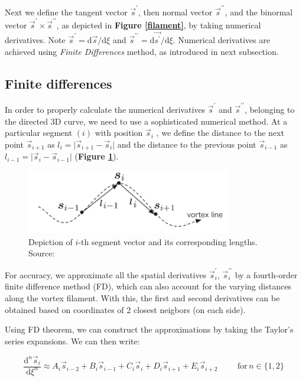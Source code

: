 Next we define the tangent vector $\vec{s}^{\prime}$, then normal vector $\vec{s}^{\prime\prime}$, and the binormal vector $\vec{s}^{\prime} \times \vec{s}^{\prime\prime}$, as depicted in \textbf{Figure \ref{filament}}, by taking numerical derivatives.
Note $\vec{s}^{\prime} = \text{d}\vec{s} / \text{d}\xi$ and $\vec{s}^{\prime\prime} = \text{d}\vec{s^{\prime}} / \text{d}\xi$.
Numerical derivatives are achieved using \textit{Finite Differences} method, as introduced in next subsection.


\subsection*{Finite differences}

In order to properly calculate the numerical derivatives $\vec{s}^{\prime}$ and $\vec{s}^{\prime\prime}$, belonging to the directed 3D curve, we need to use a sophisticated numerical method.
At a particular segment $(i)$ with position $\vec{s}_i$ , we define the distance to the next point $\vec{s}_{i+1}$ as $l_{i} = \vert \vec{s}_{i+1} - \vec{s}_i \vert$ and the distance to the previous point $\vec{s}_{i-1}$ as $l_{i-1} = \vert \vec{s}_i - \vec{s}_{i-1} \vert$ (\textbf{Figure \ref{FD}}).

\begin{figure}[h]
	\centering
	\includegraphics[width=0.8\textwidth]{graphics/simul/finite-diff}
	\caption{Depiction of $i$-th segment vector and its corresponding lengths. Source: \cite{tsubota}}
	\label{FD}
\end{figure}

For accuracy, we approximate all the spatial derivatives $\vec{s}_i^{\prime}$, $\vec{s}_i^{\prime\prime}$ by a
fourth-order finite difference method (FD), which can also account for the varying distances along the vortex filament. With this, the first and second derivatives can be obtained based on coordinates of 2 closest neigbors (on each side).

Using FD theorem, we can construct the approximations by taking the Taylor's series expansions. We can then write:

\begin{equation}
\frac{\text{d}^n\vec{s}_i}{\text{d}\xi^n} \approx
A_i\vec{s}_{i-2} +
B_i\vec{s}_{i-1} +
C_i\vec{s}_{i} +
D_i\vec{s}_{i+1} +
E_i\vec{s}_{i+2}
\hspace{1cm}
\text{for} \,n\in\{1,2\}
\label{FDcoeffs}
\end{equation}

